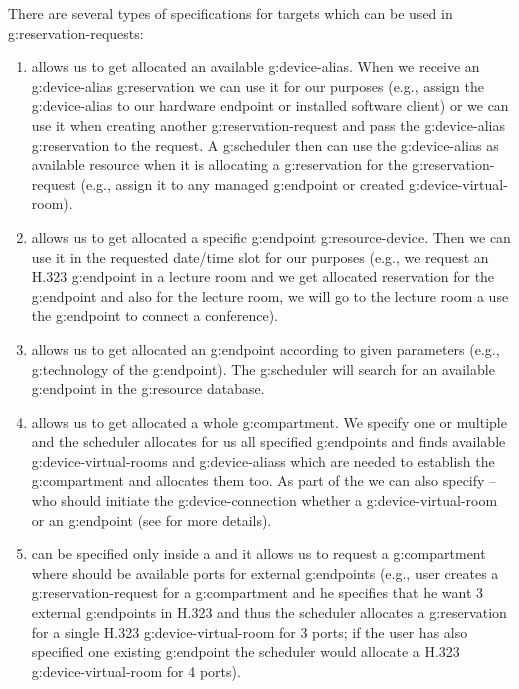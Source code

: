 There are several types of specifications for targets which can be used in \glspl{g:reservation-request}:
\begin{enumerate}
\item {} allows us to get allocated an available \gls{g:device-alias}. When we receive an \gls{g:device-alias} \gls{g:reservation} we can use it for our purposes (e.g., assign the \gls{g:device-alias} to our hardware endpoint or installed software client) or we can use it when creating another \gls{g:reservation-request} and pass the \gls{g:device-alias} \gls{g:reservation} to the request. A \gls{g:scheduler} then can use the \gls{g:device-alias} as available resource when it is allocating a \gls{g:reservation} for the \gls{g:reservation-request} (e.g., assign it to any managed \gls{g:endpoint} or created \gls{g:device-virtual-room}). 

\item {} allows us to get allocated a specific \gls{g:endpoint} \gls{g:resource-device}. Then we can use it in the requested date/time slot for our purposes (e.g., we request an H.323 \gls{g:endpoint} in a lecture room and we get allocated reservation for the \gls{g:endpoint} and also for the lecture room, we will go to the lecture room a use the \gls{g:endpoint} to connect a conference).

\item {} allows us to get allocated an \gls{g:endpoint} according to given parameters (e.g., \gls{g:technology} of the \gls{g:endpoint}). The \gls{g:scheduler} will search for an available \gls{g:endpoint} in the \gls{g:resource} database.

\item {} allows us to get allocated a whole \gls{g:compartment}. We specify one or multiple  and the scheduler allocates for us all specified \glspl{g:endpoint} and finds available \glspl{g:device-virtual-room} and \glspl{g:device-alias} which are needed to establish the \gls{g:compartment} and allocates them too. As part of the  we can also specify  -- who should initiate the \gls{g:device-connection} whether a \gls{g:device-virtual-room} or an \gls{g:endpoint} (see  for more details).

\item {} can be specified only inside a  and it allows us to request a \gls{g:compartment} where should be available ports for external \glspl{g:endpoint} (e.g., user creates a \gls{g:reservation-request} for a \gls{g:compartment} and he specifies that he want 3 external \glspl{g:endpoint} in H.323 and thus the scheduler allocates a \gls{g:reservation} for a single H.323 \gls{g:device-virtual-room} for 3 ports; if the user has also specified one existing \gls{g:endpoint} the scheduler would allocate a H.323 \gls{g:device-virtual-room} for 4 ports).


\end{enumerate}
